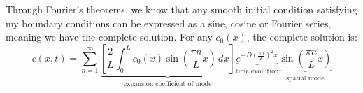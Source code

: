 Through Fourier's theorems, we know that any smooth initial condition satisfying my boundary conditions can be expressed as a sine, cosine or Fourier series, meaning we have the complete solution. For any $c_0(x)$, the complete solution is:
\begin{equation}
	\boxed{c(x,t) = \sum_{n=1}^\infty \underbrace{\left[ \frac 2L \int_0^L c_0(\tilde  x)\sin\left(\frac{\pi n}L\tilde x\right)\,d\tilde x\right]}_{\text{expansion coefficient of mode}} \underbrace{e^{-D\left(\frac{\pi n}{L}\right)^2x}}_{\text{time evolution}}\underbrace{\sin\left(\frac{\pi n}{L} x\right)}_{\text{spatial mode}}}
\end{equation}
\setcounter{chapter}{4}
\renewcommand{\thechapter}{\arabic{chapter}}


